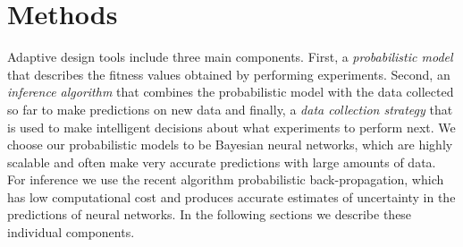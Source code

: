 \section{Methods}

Adaptive design tools include three main components. First, a
\emph{probabilistic model} that describes the fitness values obtained by
performing experiments. Second, an \emph{inference algorithm} that combines the
probabilistic model with the data collected so far to make predictions on new
data and finally, a \emph{data collection strategy} that is used to make
intelligent decisions about what experiments to perform next. We choose our
probabilistic models to be Bayesian neural networks, which are highly scalable
and often make very accurate predictions with large amounts of data. For
inference we use the recent algorithm probabilistic back-propagation, which has low computational cost and produces accurate
estimates of uncertainty in the predictions of neural networks.
In the following sections we describe these individual components.




